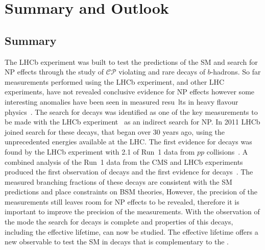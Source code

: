 \chapter{{\bf Summary and Outlook}}
\label{sec:summaryandoutlook}

\section{Summary}
The LHCb experiment was built to test the predictions of the SM and search for NP effects through the study of $\mathcal{CP}$ violating and rare decays of $b$-hadrons. So far measurements performed using the LHCb experiment, and other LHC experiments, have not revealed conclusive evidence for NP effects however some interesting anomalies have been seen in measured resu\
lts in heavy flavour physics~\cite{PhysRevLett.118.111801,Aaij:2014pli,Aaij:2015yra,Lees:2013uzd,Huschle:2015rga,Lees:2012xj,Aaij:2015oid,Aaij:2015esa,PhysRevLett.113.151601, R_K_star}. %
The search for \bmumu decays was identified as one of the key measurements to be made with the LHCb experiment~\cite{Adeva:2009ny} as an indirect search for NP.
In 2011 LHCb joined search for these decays, that began over 30 years ago, using the unprecedented energies available at the LHC. The first evidence for \bsmumu decays was found by the LHCb experiment with 2.1 \fb of Run~1 data from $pp$ collisions~\cite{Aaij:2012nna}. A combined analysis of the Run~1 data from the CMS and LHCb experiments produced the first observation of \bsmumu decays and the first evidence for \bdmumu decays~\cite{CMS:2014xfa}. The measured branching fractions of these decays are consistent with the SM predictions and place constraints on BSM theories, However, the precision of the measurements still leaves room for NP effects to be revealed, therefore it is important to improve the precision of the \BF measurements. With the observation of the \bs mode the search for \bsmumu decays is complete and properties of this decays, including the effective lifetime, can now be studied. The effective lifetime offers a new observable to test the SM in \bsmumu decays that is complementary to the \BF. 

